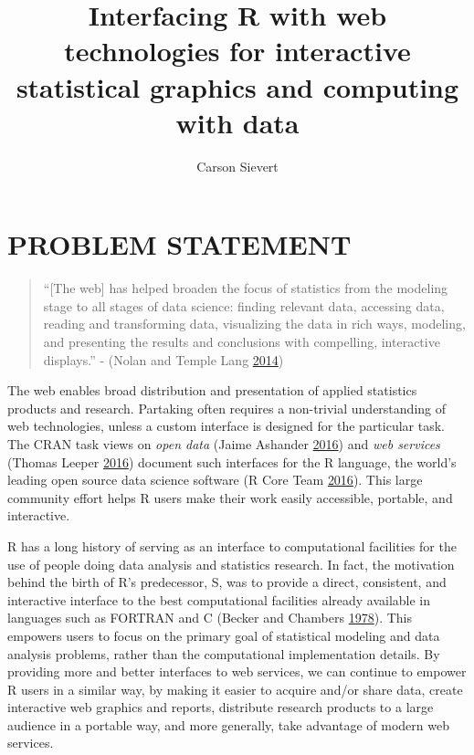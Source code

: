 \documentclass[12pt,]{isuthesis}
\title{Interfacing R with web technologies for interactive statistical graphics
and computing with data}
\author{Carson Sievert}
\date{}
\begin{document}
\maketitle

{
\hypersetup{linkcolor=black}
\vspace{-2cm}
\setcounter{tocdepth}{2}
\tableofcontents
}

\listoftables
\cleardoublepage {} {}
\listoffigures


\cleardoublepage {}


\newpage
{}

\setlength\parindent{24pt}

\chapter{PROBLEM STATEMENT}

\begin{quote}
``{[}The web{]} has helped broaden the focus of statistics from the
modeling stage to all stages of data science: finding relevant data,
accessing data, reading and transforming data, visualizing the data in
rich ways, modeling, and presenting the results and conclusions with
compelling, interactive displays.'' - (Nolan and Temple Lang
\protect\hyperlink{ref-nolan-lang}{2014})
\end{quote}

The web enables broad distribution and presentation of applied
statistics products and research. Partaking often requires a non-trivial
understanding of web technologies, unless a custom interface is designed
for the particular task. The CRAN task views on \emph{open data} (Jaime
Ashander \protect\hyperlink{ref-OpenData}{2016}) and \emph{web services}
(Thomas Leeper \protect\hyperlink{ref-WebServices}{2016}) document such
interfaces for the R language, the world's leading open source data
science software (R Core Team \protect\hyperlink{ref-RCore}{2016}). This
large community effort helps R users make their work easily accessible,
portable, and interactive.

R has a long history of serving as an interface to computational
facilities for the use of people doing data analysis and statistics
research. In fact, the motivation behind the birth of R's predecessor,
S, was to provide a direct, consistent, and interactive interface to the
best computational facilities already available in languages such as
FORTRAN and C (Becker and Chambers
\protect\hyperlink{ref-S:1978}{1978}). This empowers users to focus on
the primary goal of statistical modeling and data analysis problems,
rather than the computational implementation details. By providing more
and better interfaces to web services, we can continue to empower R
users in a similar way, by making it easier to acquire and/or share
data, create interactive web graphics and reports, distribute research
products to a large audience in a portable way, and more generally, take
advantage of modern web services.
\end{document}
